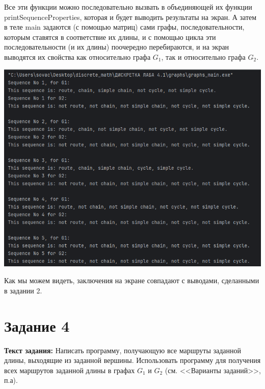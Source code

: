 \documentclass[12pt]{article}
\begin{document}
	Все эти функции можно последовательно вызвать в объединяющей их функции printSequenceProperties, которая и будет выводить результаты на экран. А затем в теле main задаются (с помощью матриц) сами графы, последовательности, которым ставятся в соответствие их длины, и с помощью цикла эти последовательности (и их длины) поочередно перебираются, и на экран выводятся их свойства как относительно графа $G_1$, так и относительно графа $G_2$.
	
	
	
	{\centering
	\includegraphics[width=150mm]{images/sequences_properties.png} 
	}
	
	Как мы можем видеть, заключения на экране совпадают с выводами, сделанными в задании 2.
	
	\section{Задание 4}
	\label{task4}

	{\bf Текст задания:} Написать программу, получающую все маршруты заданной длины, выходящие из заданной вершины. Использовать программу для получения всех маршрутов заданной длины в графах $G_1$ и $G_2$ (см. <<Варианты заданий>>, п.а).
	
\end{document}
